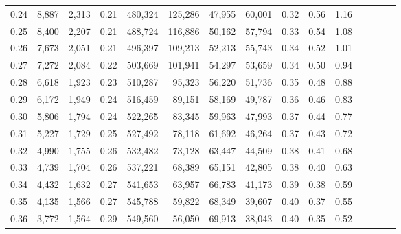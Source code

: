 \begin{tabular}{rrrcrrrrrrrrrrr}
0.24 &   8,887 &  2,313 &                                       0.21 &  480,324 &  125,286 &   47,955 &   60,001 &  0.32 &  0.56 &                         1.16 \\
0.25 &   8,400 &  2,207 &                                       0.21 &  488,724 &  116,886 &   50,162 &   57,794 &  0.33 &  0.54 &                         1.08 \\
0.26 &   7,673 &  2,051 &                                       0.21 &  496,397 &  109,213 &   52,213 &   55,743 &  0.34 &  0.52 &                         1.01 \\
0.27 &   7,272 &  2,084 &                                       0.22 &  503,669 &  101,941 &   54,297 &   53,659 &  0.34 &  0.50 &                         0.94 \\
0.28 &   6,618 &  1,923 &                                       0.23 &  510,287 &   95,323 &   56,220 &   51,736 &  0.35 &  0.48 &                         0.88 \\
0.29 &   6,172 &  1,949 &                                       0.24 &  516,459 &   89,151 &   58,169 &   49,787 &  0.36 &  0.46 &                         0.83 \\
0.30 &   5,806 &  1,794 &                                       0.24 &  522,265 &   83,345 &   59,963 &   47,993 &  0.37 &  0.44 &                         0.77 \\
0.31 &   5,227 &  1,729 &                                       0.25 &  527,492 &   78,118 &   61,692 &   46,264 &  0.37 &  0.43 &                         0.72 \\
0.32 &   4,990 &  1,755 &                                       0.26 &  532,482 &   73,128 &   63,447 &   44,509 &  0.38 &  0.41 &                         0.68 \\
0.33 &   4,739 &  1,704 &                                       0.26 &  537,221 &   68,389 &   65,151 &   42,805 &  0.38 &  0.40 &                         0.63 \\
0.34 &   4,432 &  1,632 &                                       0.27 &  541,653 &   63,957 &   66,783 &   41,173 &  0.39 &  0.38 &                         0.59 \\
0.35 &   4,135 &  1,566 &                                       0.27 &  545,788 &   59,822 &   68,349 &   39,607 &  0.40 &  0.37 &                         0.55 \\
0.36 &   3,772 &  1,564 &                                       0.29 &  549,560 &   56,050 &   69,913 &   38,043 &  0.40 &  0.35 &                         0.52 \\

\end{tabular}
